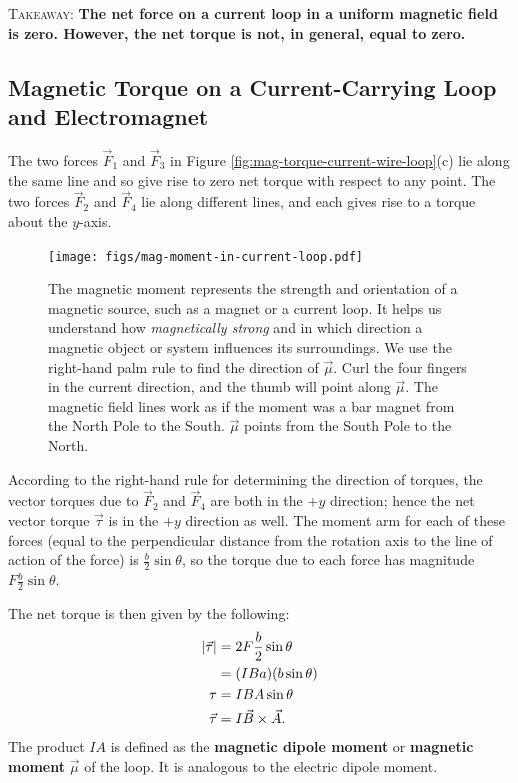 \documentclass[12pt,b4paper]{article}
\begin{document}
\textsc{Takeaway}: \textbf{The net force on a current loop in a uniform magnetic field is zero. However, the net torque is not, in general, equal to zero.}

\subsection{Magnetic Torque on a Current-Carrying Loop and Electromagnet}
The two forces $\vec{F}_1$ and $\vec{F}_3$ in Figure \ref{fig:mag-torque-current-wire-loop}(c) lie along the same line and so give rise to zero net torque with respect to any point. The two forces $\vec{F}_2$ and $\vec{F}_4$ lie along different lines, and each gives rise to a torque about the $y$-axis. 
\begin{figure}[H]
    \centering
    \texttt{[image: figs/mag-moment-in-current-loop.pdf]}
    \caption{The magnetic moment represents the strength and orientation of a magnetic source, such as a magnet or a current loop. It helps us understand how \textit{magnetically strong} and in which direction a magnetic object or system influences its surroundings. We use the right-hand palm rule to find the direction of $\vec{\mu}$. Curl the four fingers in the current direction, and the thumb will point along $\vec{\mu}$. The magnetic field lines work as if the moment was a bar magnet from the North Pole to the South. $\vec{\mu}$ points from the South Pole to the North.}
    \label{fig:mag-moment}
\end{figure}
According to the right-hand rule for determining the direction of torques, the vector torques due to $\vec{F}_2$ and $\vec{F}_4$ are both in the $+y$ direction; hence the net vector torque $\vec{\tau}$ is in the $+y$ direction as well. The moment arm for each of these forces (equal to the perpendicular distance from the rotation axis to the line of action of the force) is $\displaystyle \frac{b}{2}\sin\theta$, so the torque due to each force has magnitude $\displaystyle F\frac{b}{2}\sin\theta$. 

The net torque is then given by the following:
\begin{align}
    |\vec{\tau}|&=2F\frac{b}{2}\sin\theta\notag\\
    &=(IBa)(b\sin\theta)\notag\\
    \tau&=IBA\sin\theta\notag\\
    \vec{\tau}&=I\vec{B}\times\vec{A}.
\end{align}
The product $IA$ is defined as the \textbf{magnetic dipole moment} or \textbf{magnetic moment} $\vec{\mu}$ of the loop. It is analogous to the electric dipole moment.
\end{document}
